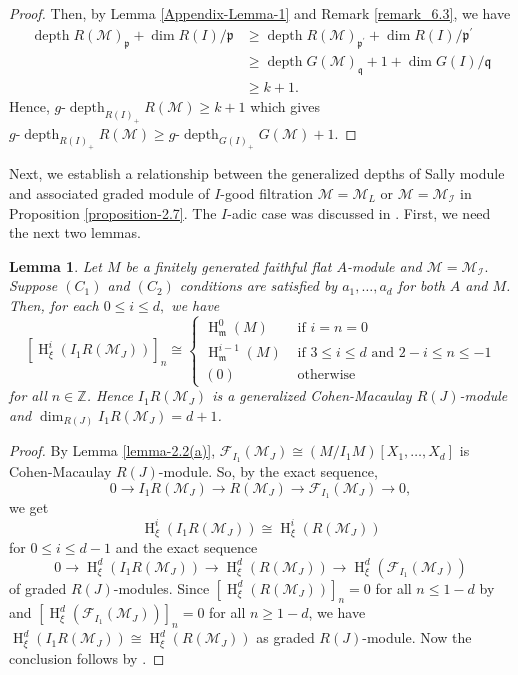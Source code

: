 \documentclass[11pt,reqno]{amsart}
\newtheorem{lemma}[theorem]{Lemma}
\theoremstyle{definition}
\newcommand{\m}{\mathfrak m}
\newcommand{\p}{\mathfrak p}
\newcommand{\q}{\mathfrak q}
\def\R{{\mathcal R}}
\def\F{{\mathcal F}}
\def\M{{\mathcal M}}
\def\I{{\mathcal I}}
\DeclareMathOperator{\h}{H}
\DeclareMathOperator{\depth}{depth}
\numberwithin{equation}{section}
\begin{document}
\begin{proof}
        
		
        Then, by Lemma  \ref{Appendix-Lemma-1} and Remark \ref{remark_6.3}, we have
		\begin{align*}
			\depth R(\M)_\p+\dim R(I)/\p &\geq \depth R(\M)_{\p^\prime}+\dim R(I)/\p^\prime\\
			&\geq \depth G(\M)_\q+1+\dim G(I)/\q\\
			&\geq k+1.
		\end{align*}
		Hence, $g\text{-} \depth_{R(I)_+} R(\M)\geq k+1$ which gives 
		$g\text{-} \depth_{R(I)_+}R(\M)\geq g\text{-} \depth_{G(I)_+} G(\M)+1.$
	\end{proof}
	Next, we establish a relationship between the generalized depths of Sally module and associated graded module of $I$-good filtration $\M=\M_L$ or $\M=\M_\I$ in Proposition \ref{proposition-2.7}. The $I$-adic case was discussed in \cite{ozeki13}.
	First, we need the next two lemmas. 
	\begin{lemma}\label{lemma-2.6(a)}
     Let $M$ be a finitely generated faithful flat $A$-module and $\M=\M_\I.$ Suppose $(C_1)$ and $(C_2)$ conditions are satisfied by $a_1,\ldots,a_d$ for both $A$ and $M$. Then, for each $0\leq i\leq d,$ we have 
		$$[\h_\xi^i(I_1R(\M_J))]_n\cong\begin{cases} \h_\m^0(M)  & \mbox{ if } i=n=0\\
			\h_\m^{i-1}(M) & \mbox{ if } 3\leq i\leq d\mbox{ and } 2-i\leq n\leq -1\\
			(0) & \mbox{ otherwise }  
		\end{cases}$$
		for all $n\in\mathbb{Z}$. Hence $I_1 R(\M_J)$ is a generalized Cohen-Macaulay $R(J)$-module and $\dim_{R(J)} I_1 R(\M_J)=d+1$. 
	\end{lemma}
	\begin{proof}
		By Lemma \ref{lemma-2.2(a)}, $\F_{I_1}(\M_J)\cong (M/I_1M)[X_1,\ldots,X_d]$ is Cohen-Macaulay $R(J)$-module. So, by the exact sequence, $$0\to I_1 R(\M_J)\to R(\M_J)\to \F_{I_1}(\M_J)\to 0,$$ we get 
		$$\h_\xi^i(I_1 R(\M_J))\cong \h_\xi^i(R(\M_J))$$  for $0\leq i\leq d-1$ and the exact sequence $$0\to\h_\xi^d(I_1 R(\M_J))\to\h_\xi^d(R(\M_J))\to\h_\xi^d(\F_{I_1}(\M_J))$$
		of graded $R(J)$-modules.  Since $[\h_\xi^d(R(\M_J))]_n=0$ for all $n\leq 1-d$ by \cite[Theorem 6.2]{trung-gcm} and $[\h_\xi^d(\F_{I_1}(\M_J))]_n=0$ for all $n\geq 1-d$, we have 
		$\h_\xi^d(I_1 R(\M_J))\cong \h_\xi^d(R(\M_J))$ as graded $R(J)$-module. Now the conclusion follows by \cite[Theorem 6.2]{trung-gcm}.
	\end{proof}
\end{document}
